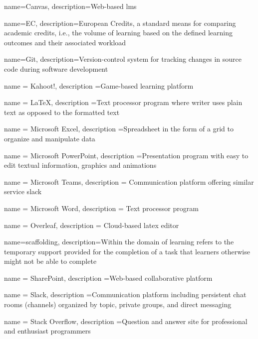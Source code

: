 {
    name=Canvas,
    description={Web-based \acrfull{lms}}
}

{
    name=EC,
    description={European Credits, a standard means for comparing academic credits, i.e., the volume of learning based on the defined learning outcomes and their associated workload}
}


{
    name=Git,
    description={Version-control system for tracking changes in source code during software development}
}

{    
    name = Kahoot!,
    description ={Game-based learning platform}
}

{ 
    name = LaTeX,
    description ={Text processor program where writer uses plain text as opposed to the formatted text}
}


{ 
    name = Microsoft Excel,
    description ={Spreadsheet in the form of a grid to organize and manipulate data}
}

{
    name = Microsoft PowerPoint,
    description ={Presentation program with easy to edit textual information, graphics and animations}
}

{
    name = Microsoft Teams,
    description = {Communication platform offering similar service \Gls{slack}}
}

{
    name = Microsoft Word,
    description = {Text processor program}
}

{
    name = Overleaf,
    description = {Cloud-based \gls{latex} editor}
}


{
    name=scaffolding,
    description={Within the domain of learning refers to the temporary support provided for the completion of a task that learners otherwise might not be able to complete~\cite{scaffolding2010}}
}


{
    name = SharePoint,
    description ={Web-based collaborative platform}
}


{
    name = Slack,
    description ={Communication platform including persistent chat rooms (channels) organized by topic, private groups, and direct messaging}
}

{
    name = Stack Overflow,
    description ={Question and answer site for professional and enthusiast programmers}
}

